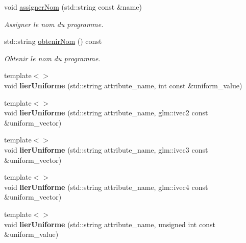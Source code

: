 \begin{DoxyCompactItemize}
void \hyperlink{classopengl_1_1_programme_a2c73542b27eb1f64e531bd3958f1136e}{assigner\-Nom} (std\-::string const \&name)
\begin{DoxyCompactList}\small\item\em Assigner le nom du programme. \end{DoxyCompactList}\item 
std\-::string \hyperlink{classopengl_1_1_programme_a4cd2ed060a3f5292a66b2f72b824fae0}{obtenir\-Nom} () const 
\begin{DoxyCompactList}\small\item\em Obtenir le nom du programme. \end{DoxyCompactList}\item 
\hypertarget{classopengl_1_1_programme_a44339c65c2631808dad3ceca8a408b34}{{\footnotesize template$<$$>$ }\\void {\bfseries lier\-Uniforme} (std\-::string attribute\-\_\-name, int const \&uniform\-\_\-value)}\label{classopengl_1_1_programme_a44339c65c2631808dad3ceca8a408b34}

\item 
\hypertarget{classopengl_1_1_programme_ac5b182663b87bbb6a48729210d631799}{{\footnotesize template$<$$>$ }\\void {\bfseries lier\-Uniforme} (std\-::string attribute\-\_\-name, glm\-::ivec2 const \&uniform\-\_\-vector)}\label{classopengl_1_1_programme_ac5b182663b87bbb6a48729210d631799}

\item 
\hypertarget{classopengl_1_1_programme_a97b1ad59c84d69115123d0498bc8d3e2}{{\footnotesize template$<$$>$ }\\void {\bfseries lier\-Uniforme} (std\-::string attribute\-\_\-name, glm\-::ivec3 const \&uniform\-\_\-vector)}\label{classopengl_1_1_programme_a97b1ad59c84d69115123d0498bc8d3e2}

\item 
\hypertarget{classopengl_1_1_programme_a98c9edec2b175e3fe8de093771a90c10}{{\footnotesize template$<$$>$ }\\void {\bfseries lier\-Uniforme} (std\-::string attribute\-\_\-name, glm\-::ivec4 const \&uniform\-\_\-vector)}\label{classopengl_1_1_programme_a98c9edec2b175e3fe8de093771a90c10}

\item 
\hypertarget{classopengl_1_1_programme_ac8e745156456250a160e10097a67c18a}{{\footnotesize template$<$$>$ }\\void {\bfseries lier\-Uniforme} (std\-::string attribute\-\_\-name, unsigned int const \&uniform\-\_\-value)}\label{classopengl_1_1_programme_ac8e745156456250a160e10097a67c18a}


\end{DoxyCompactItemize}
